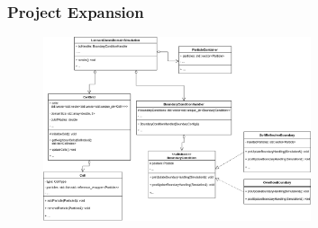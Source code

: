 \begin{frame}
    \frametitle{Project Expansion}
    \begin{figure}
        \label{fig:umlcellgrid}
        \includegraphics[width=0.7\textwidth]{../../res/UML3.drawio}
    \end{figure}
\end{frame}
